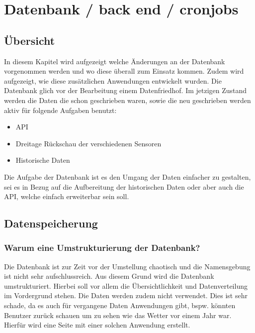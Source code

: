 \section{Datenbank / back end / cronjobs}


\subsection{Übersicht}

In diesem Kapitel wird aufgezeigt welche Änderungen an der Datenbank vorgenommen werden und wo diese überall zum Einsatz kommen. Zudem wird aufgezeigt, wie diese zusätzlichen Anwendungen entwickelt wurden. Die Datenbank glich vor der Bearbeitung einem Datenfriedhof. Im jetzigen Zustand werden die Daten die schon geschrieben waren, sowie die neu geschrieben werden aktiv für folgende Aufgaben benutzt:\\
\begin{itemize}
\item API
\item Dreitage Rückschau der verschiedenen Sensoren
\item Historische Daten
\end{itemize}

Die Aufgabe der Datenbank ist es den Umgang der Daten einfacher zu gestalten, sei es in Bezug auf die Aufbereitung der historischen Daten oder aber auch die API, welche einfach erweiterbar sein soll.


\subsection{Datenspeicherung}
\subsubsection{Warum eine Umstrukturierung der Datenbank?}
Die Datenbank ist zur Zeit vor der Umstellung chaotisch und die Namensgebung ist nicht sehr aufschlussreich. Aus diesem Grund wird die Datenbank umstrukturiert. Hierbei soll vor allem die Übersichtlichkeit und Datenverteilung im Vordergrund stehen. Die Daten werden zudem nicht verwendet. Dies ist sehr schade, da es auch für vergangene Daten Anwendungen gibt, bspw. könnten Benutzer zurück schauen um zu sehen wie das Wetter vor einem Jahr war. Hierfür wird eine Seite mit einer solchen Anwendung erstellt.

